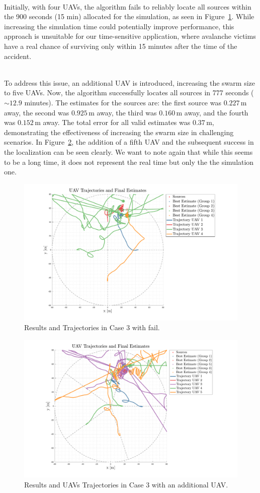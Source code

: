 \documentclass[main]{subfiles}
\begin{document}
\noindent\\
Initially, with four UAVs, the algorithm fails to reliably 
locate all sources within the 900 seconds (15 min) allocated for the simulation,
as seen in Figure~\ref{fig:case3fail}. 
While increasing the simulation time could potentially improve performance, 
this approach is unsuitable for our time-sensitive application, where
avalanche victims have a real chance of surviving only within 15 minutes
after the time of the accident.

\noindent\\
To address this issue, an additional UAV is introduced, increasing the 
swarm size to five UAVs. Now, the algorithm successfully 
locates all sources in 777 seconds (\(\sim 12.9\) minutes). 
The estimates for the sources are: the first source was \(0.227 \, \text{m}\) away, 
the second was \(0.925 \, \text{m}\) away, the third was \(0.160 \, \text{m}\) away, and the 
fourth was \(0.152 \, \text{m}\) away. The total error for all valid estimates was 
\(0.37 \, \text{m}\), demonstrating the effectiveness of increasing the 
swarm size in challenging scenarios.
In Figure~\ref{fig:case3}, the addition of a fifth UAV and the subsequent 
success in the localization can be seen clearly.
We want to note again that while this seems to be a long time,
it does not represent the real time but only the the simulation one.

\begin{figure}
    \centering
    \includegraphics[width=1.06\textwidth]{images/case_3_fail.pdf}
    \caption[PSO Case 3]{Results and Trajectories in Case 3 with fail.}
    \label{fig:case3fail}
\end{figure}

\begin{figure}
    \centering
    \includegraphics[width=1.06\textwidth]{images/case_3.pdf}
    \caption[PSO Case 3]{Results and UAVs Trajectories in Case 3 with an additional UAV.}
    \label{fig:case3}
\end{figure}
\end{document}
